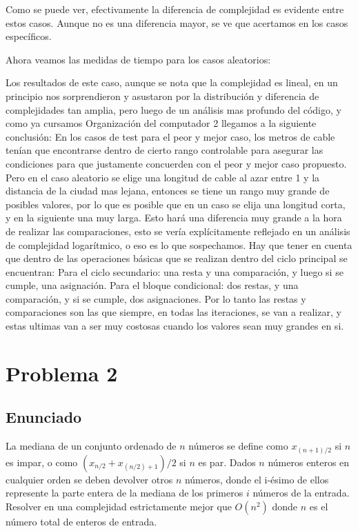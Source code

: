 \documentclass{article}
\theoremstyle{definition}
\theoremstyle{remark}
\begin{document}
Como se puede ver, efectivamente la diferencia de complejidad es evidente entre estos casos. Aunque no es una diferencia mayor, se ve que acertamos en los casos específicos.

Ahora veamos las medidas de tiempo para los casos aleatorios:


Los resultados de este caso, aunque se nota que la complejidad es lineal, en un principio nos sorprendieron y asustaron por la distribución y diferencia de complejidades tan amplia, pero luego de un análisis mas profundo del código, y como ya cursamos Organización del computador 2 llegamos a la siguiente conclusión: En los casos de test para el peor y mejor caso, los metros de cable tenían que encontrarse dentro de cierto rango controlable para asegurar las condiciones para que justamente concuerden con el peor y mejor caso propuesto. Pero en el caso aleatorio se elige una longitud de cable al azar entre 1 y la distancia de la ciudad mas lejana, entonces se tiene un rango muy grande de posibles valores, por lo que es posible que en un caso se elija una longitud corta, y en la siguiente una muy larga. Esto hará una diferencia muy grande a la hora de realizar las comparaciones, esto se vería explícitamente reflejado en un análisis de complejidad logarítmico, o eso es lo que sospechamos. Hay que tener en cuenta que dentro de las operaciones básicas que se realizan dentro del ciclo principal se encuentran:
Para el ciclo secundario: una resta y una comparación, y luego si se cumple, una asignación.
Para el bloque condicional: dos restas, y una comparación, y si se cumple, dos asignaciones.
Por lo tanto las restas y comparaciones son las que siempre, en todas las iteraciones, se van a realizar, y estas ultimas van a ser muy costosas cuando los valores sean muy grandes en si.

\section{Problema 2}

\subsection{Enunciado}

La mediana de un conjunto ordenado de $n$ números se define como $x_{(n+1)/2}$ si $n$ es impar, o como $(x_{n/2} + x_{(n/2)+1})/2$ si $n$ es par. Dados $n$ números enteros en cualquier orden se deben devolver otros $n$ números, donde el i-ésimo de ellos represente la parte entera de la mediana de los primeros $i$ números de la entrada.
Resolver en una complejidad estrictamente mejor que $O(n^2)$ donde $n$ es el número total de enteros de entrada.
\end{document}

